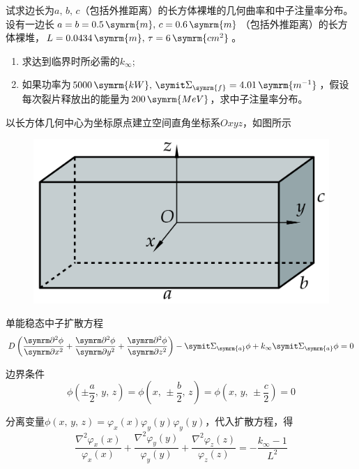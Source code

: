 \begin{exercise}
    试求边长为$a,\,b,\,c$（包括外推距离）的长方体裸堆的几何曲率和中子注量率分布。设有一边长$a = b = 0.5\,\symrm{m},\,c = 0.6\,\symrm{m}$（包括外推距离）的长方体裸堆，$L = 0.0434\,\symrm{m},\,\tau = 6\,\symrm{cm^2}$。
    \begin{enumerate}[(1)]
        \item 求达到临界时所必需的$k_{\infty}$;
        \item 如果功率为$5000\,\symrm{kW},\,\vSigma_{\symrm{f}} = 4.01\,\symrm{m^{-1}}$，假设每次裂片释放出的能量为$200\,\symrm{MeV}$，求中子注量率分布。
    \end{enumerate}
    \begin{solution}
        以长方体几何中心为坐标原点建立空间直角坐标系$Oxyz$，如图所示
        \begin{figure}[H]
            \centering
            \includegraphics[scale=1]{figures/fig4.5.png}
        \end{figure}
        单能稳态中子扩散方程
        \begin{equation*}
            D\left(\pddv{\phi}{x}+\pddv{\phi}{y}+\pddv{\phi}{z}\right) - \vSigma_{\symrm{a}}\phi + k_{\infty}\vSigma_{\symrm{a}}\phi = 0
        \end{equation*}

        边界条件
        \begin{equation*}
            \phi\left(\pm \frac{a}{2},\,y,\,z\right) = \phi\left(x,\,\pm \frac{b}{2},\,z\right) = \phi\left(x,\,y,\,\pm \frac{c}{2}\right) = 0
        \end{equation*}

        分离变量$\phi(x,\,y,\,z) = \varphi_x(x)\varphi_y(y)\varphi_y(y)$，代入扩散方程，得
        \begin{equation*}
            \frac{\nabla^2\varphi_x(x)}{\varphi_x(x)} + \frac{\nabla^2\varphi_y(y)}{\varphi_y(y)} + \frac{\nabla^2\varphi_z(z)}{\varphi_z(z)} = -\frac{k_{\infty}-1}{L^2}
        \end{equation*}


\end{solution}
\end{exercise}
